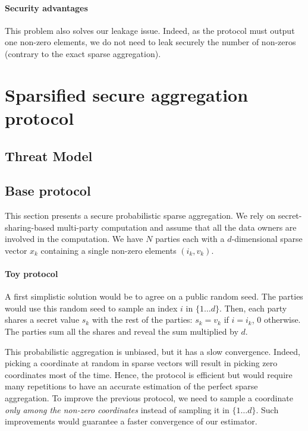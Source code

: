 \documentclass[sigconf,balance=false]{acmart}
\begin{document}
\paragraph{Security advantages}
This problem also solves our leakage issue.
Indeed, as the protocol must output one non-zero elements, we do not need to leak securely the number of non-zeros (contrary to the exact sparse aggregation).

\section{Sparsified secure aggregation protocol}

\subsection{Threat Model}


\subsection{Base protocol}
This section presents a secure probabilistic sparse aggregation.
We rely on secret-sharing-based multi-party computation and assume that all the data owners are involved in the computation.
We have $N$ parties each with a $d$-dimensional sparse vector $x_k$ containing a single non-zero elements $(i_k, v_k)$.

\paragraph{Toy protocol}

A first simplistic solution would be to agree on a public random seed.
The parties would use this random seed to sample an index $i$ in $\{1\dots d\}$.
Then, each party shares a secret value $s_k$ with the rest of the parties: $s_k = v_k$ if $i = i_k$, $0$ otherwise.
The parties sum all the shares and reveal the sum multiplied by $d$.

This probabilistic aggregation is unbiased, but it has a slow convergence.
Indeed, picking a coordinate at random in sparse vectors will result in picking zero coordinates most of the time.
Hence, the protocol is efficient but would require many repetitions to have an accurate estimation of the perfect sparse aggregation.
To improve the previous protocol, we need to sample a coordinate \emph{only among the non-zero coordinates} instead of sampling it in $\{1\dots d\}$.
Such improvements would guarantee a faster convergence of our estimator.
\end{document}
